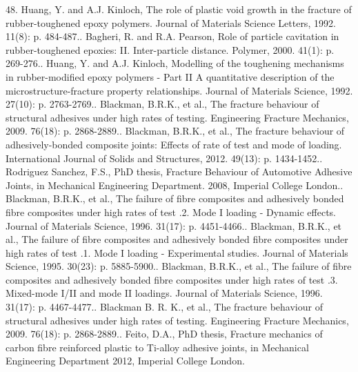 \documentclass[numbers=noendperiod,chapterprefix=on]{icldt} %
\begin{document}
48.	Huang, Y. and A.J. Kinloch, The role of plastic void growth in the fracture of rubber-toughened epoxy polymers. Journal of Materials Science Letters, 1992. 11(8): p. 484-487..	Bagheri, R. and R.A. Pearson, Role of particle cavitation in rubber-toughened epoxies: II. Inter-particle distance. Polymer, 2000. 41(1): p. 269-276..	Huang, Y. and A.J. Kinloch, Modelling of the toughening mechanisms in rubber-modified epoxy polymers - Part II A quantitative description of the microstructure-fracture property relationships. Journal of Materials Science, 1992. 27(10): p. 2763-2769..	Blackman, B.R.K., et al., The fracture behaviour of structural adhesives under high rates of testing. Engineering Fracture Mechanics, 2009. 76(18): p. 2868-2889..	Blackman, B.R.K., et al., The fracture behaviour of adhesively-bonded composite joints: Effects of rate of test and mode of loading. International Journal of Solids and Structures, 2012. 49(13): p. 1434-1452..	Rodriguez Sanchez, F.S., PhD thesis, Fracture Behaviour of Automotive Adhesive Joints, in Mechanical Engineering Department. 2008, Imperial College London..	Blackman, B.R.K., et al., The failure of fibre composites and adhesively bonded fibre composites under high rates of test .2. Mode I loading - Dynamic effects. Journal of Materials Science, 1996. 31(17): p. 4451-4466..	Blackman, B.R.K., et al., The failure of fibre composites and adhesively bonded fibre composites under high rates of test .1. Mode I loading - Experimental studies. Journal of Materials Science, 1995. 30(23): p. 5885-5900..	Blackman, B.R.K., et al., The failure of fibre composites and adhesively bonded fibre composites under high rates of test .3. Mixed-mode I/II and mode II loadings. Journal of Materials Science, 1996. 31(17): p. 4467-4477..	Blackman B. R. K., et al., The fracture behaviour of structural adhesives under high rates of testing. Engineering Fracture Mechanics, 2009. 76(18): p. 2868-2889..	Feito, D.A., PhD thesis, Fracture mechanics of carbon fibre reinforced plastic to Ti-alloy adhesive joints, in Mechanical Engineering Department 2012, Imperial College London.\newline
\end{document}
